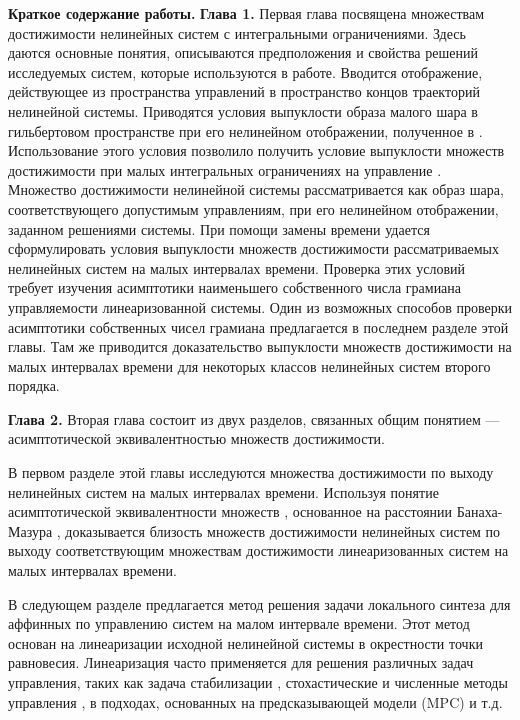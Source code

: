 \documentclass[../main.tex]{subfiles}
\begin{document}
\textbf{Краткое содержание работы.} \textbf{Глава 1. } 
Первая глава посвящена множествам достижимости нелинейных систем с интегральными ограничениями. 
Здесь даются основные понятия, описываются предположения и свойства решений исследуемых систем, которые используются в работе. 
Вводится отображение, действующее из пространства управлений в пространство концов траекторий нелинейной системы. 
Приводятся условия выпуклости образа малого шара в гильбертовом пространстве при его нелинейном отображении, полученное в \cite{Polyak2001}. 
Использование этого условия позволило получить условие выпуклости множеств достижимости при малых интегральных ограничениях на управление \cite{Polyak2004}.
Множество достижимости нелинейной системы рассматривается как образ шара, соответствующего допустимым управлениям, при его нелинейном отображении, заданном решениями системы.
При помощи замены времени удается сформулировать условия выпуклости множеств достижимости рассматриваемых нелинейных систем на малых интервалах времени. 
Проверка этих условий требует изучения асимптотики наименьшего собственного числа грамиана управляемости линеаризованной системы.
Один из возможных способов проверки асимптотики собственных чисел грамиана предлагается в последнем разделе этой главы. 
Там же приводится доказательство выпуклости множеств достижимости на малых интервалах времени для некоторых классов нелинейных систем второго порядка. 

\textbf{Глава 2. }
Вторая глава состоит из двух разделов, связанных общим понятием --- асимптотической эквивалентностью множеств достижимости. 

В первом разделе этой главы исследуются множества достижимости по выходу нелинейных систем на малых интервалах времени.
Используя понятие асимптотической эквивалентности множеств \cite{Ovs}, основанное на расстоянии Банаха-Мазура \cite{Thompson}, доказывается близость множеств достижимости нелинейных систем по выходу соответствующим множествам достижимости линеаризованных систем на малых интервалах времени. 

В следующем разделе предлагается метод решения задачи локального синтеза для аффинных по управлению систем на малом интервале времени. 
Этот метод основан на линеаризации исходной нелинейной системы в окрестности точки равновесия. 
Линеаризация часто применяется для решения различных задач управления, таких как задача стабилизации \cite{Kras_add,Khalil}, стохастические и численные методы управления \cite{Roxin,EKF,denBerg,Pang}, в подходах, основанных на предсказывающей модели (MPC) \cite{Murillo,LTV_MPC} и т.д.
\end{document}

